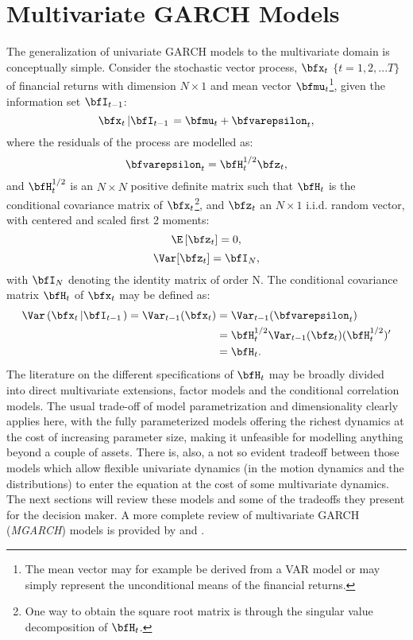 \section{Multivariate GARCH Models}
The generalization of univariate GARCH models to the multivariate domain is
conceptually simple. Consider the stochastic vector process, $\bfx_t$ $\{t=1,2,...T\}$
of financial returns with dimension $N\times 1$ and mean vector $\bfmu_t$\footnote{The mean
vector may for example be derived from a VAR model or may simply represent the
unconditional means of the financial returns.}, given the information set $\bfI_{t-1}$:
\begin{equation}\label{eq:mgarch1}
\bfx_t\left| \bfI_{t - 1} \right. = \bfmu _t + \bfvarepsilon _t,
\end{equation}
where the residuals of the process are modelled as:
\begin{equation}\label{eq:mgarch2}
{\bfvarepsilon _t} = \bfH_t^{1/2}{\bfz_t},
\end{equation}
and $\bfH_t^{1/2}$ is an $N\times N$ positive definite matrix such that $\bfH_t$
is the conditional covariance matrix of $\bfx_t$\footnote{One way to obtain the
square root matrix is through the singular value decomposition of $\bfH_t$.},
and $\bfz_t$ an $N\times 1$ i.i.d. random vector, with centered and scaled first 2 moments:
\begin{equation}\notag
\E\left[\bfz_t\right] = 0,
\end{equation}
\begin{equation}\label{eq:mgarch3}
\Var[{\bfz_t}] = {\bfI_N},
\end{equation}
with $\bfI_N$ denoting the identity matrix of order N. The conditional covariance
matrix $\bfH_t$ of $\bfx_t$ may be defined as:
\begin{align}
\Var\left(\bfx_t\left| \bfI_{t - 1}\right.\right) =  \Var_{t - 1}(\bfx_t) &= \Var_{t - 1}(\bfvarepsilon_t)\nonumber \\
& = \bfH_t^{1/2}\Var_{t - 1}(\bfz_t)(\bfH_t^{1/2})' \nonumber \\
& = \bfH_t.\label{eq:mgarch4}
\end{align}
The literature on the different specifications of $\bfH_t$ may be broadly divided
into direct multivariate extensions, factor models and the conditional correlation
models. The usual trade-off of model parametrization and dimensionality clearly
applies here, with the fully parameterized models offering the richest dynamics
at the cost of increasing parameter size, making it unfeasible for modelling
anything beyond a couple of assets. There is, also, a not so evident tradeoff
between those models which allow flexible univariate dynamics (in the motion
dynamics and the distributions) to enter the equation at the cost of some
multivariate dynamics. The next sections will review these models and some of
the tradeoffs they present for the decision maker. A more complete review of
multivariate GARCH (\emph{MGARCH}) models is provided by \cite{Bauwens2006}
and \cite{Silvennoinen2009a}.

